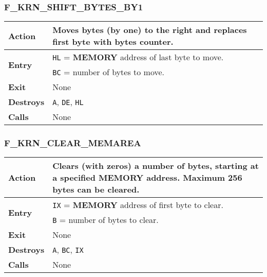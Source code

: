     \subsubsection{F\_KRN\_SHIFT\_BYTES\_BY1}
    \label{func:fkrnshiftbytesby1}
    \begin{tabular}{l p{9cm}}
        \hline\textbf{Action}
        & Moves bytes (by one) to the right and replaces first byte with
        bytes counter.\\
        \hline\multirow[t]{2}{4em}{\textbf{Entry}}
        & \texttt{HL} = \textbf{MEMORY} address of last byte to move.\\
        & \texttt{BC} = number of bytes to move.\\
        \hline\textbf{Exit} & None\\
        \hline\textbf{Destroys} & \texttt{A}, \texttt{DE}, \texttt{HL}\\
        \hline\textbf{Calls} & None\\
        \hline
    \end{tabular}

    \subsubsection{F\_KRN\_CLEAR\_MEMAREA}
    \label{func:fkrnclearmemarea}
    \begin{tabular}{l p{9cm}}
        \hline\textbf{Action}
        & Clears (with zeros) a number of bytes, starting at a specified
        \textbf{MEMORY} address. Maximum 256 bytes can be cleared.\\
        \hline\multirow[t]{2}{4em}{\textbf{Entry}}
        & \texttt{IX} = \textbf{MEMORY} address of first byte to clear.\\
        & \texttt{B} = number of bytes to clear.\\
        \hline\textbf{Exit} & None\\
        \hline\textbf{Destroys} & \texttt{A}, \texttt{BC}, \texttt{IX}\\
        \hline\textbf{Calls} & None\\
        \hline
    \end{tabular}

